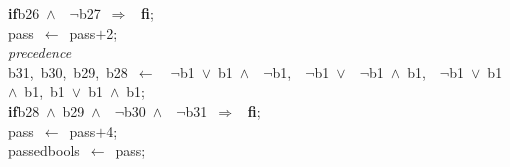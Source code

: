 \documentclass{report}
\begin{document}
\begin{tabbing}
{\bf if}\>b26\ $\wedge$\ \ $\neg$b27\ $\Rightarrow$
\ {\bf {f}{i}};
\\
pass\ $\leftarrow$\ pass$+$2;\\
{\tt{}}{\em{} precedence
}\\
b31,\ b30,\ b29,\ b28\ $\leftarrow$\ \ $\neg$b1\ $\vee$\ b1\ $\wedge$\ \ $\neg$b1,\ \ $\neg$b1\ $\vee$\ \ $\neg$b1\ $\wedge$\ b1,\ \ $\neg$b1\ $\vee$\ b1\ $\wedge$\ b1,\ b1\ $\vee$\ b1\ $\wedge$\ b1;\\
{\bf if}\>b28\ $\wedge$\ b29\ $\wedge$\ \ $\neg$b30\ $\wedge$\ \ $\neg$b31\ $\Rightarrow$
\ {\bf {f}{i}};
\\
pass\ $\leftarrow$\ pass$+$4;\\
passedbools\ $\leftarrow$\ pass;\\
\end{tabbing}
\end{document}
